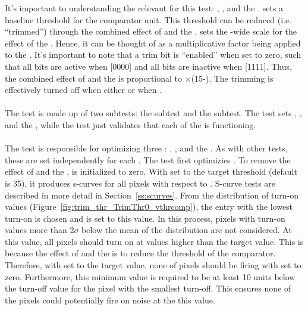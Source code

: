 It's important to understanding the relevant \dacs for this test: \vthrcomp, \vtrim, and the \trimbits.
\vthrcomp sets a baseline threshold for the comparator unit.
This threshold can be reduced (i.e. ``trimmed'') through the combined effect of \vtrim and the \trimbits.
\vtrim sets the \roc-wide scale for the effect of the \trimbits.
Hence, it can be thought of as a multiplicative factor being applied to the \trimbits.
It's important to note that a trim bit is ``enabled'' when set to zero, 
such that all bits are active when  [0000] and all bits are inactive when  [1111].
Thus, the combined effect of \vtrim and the \trimbits is proportional to \vtrim$\times$(15-\trimbits).
The trimming is effectively turned off when either  or when .
\\\\
The \trimming test is made up of two subtests: the \trim subtest and the \trimbit subtest. 
The \trim test sets \vthrcomp, \vtrim, and the \trimbits, while the \trimbit test just validates that each of the \trimbits is functioning.
\\\\
The \trim test is responsible for optimizing three \dacs: \vthrcomp, \vtrim, and the \trimbits.
As with other tests, these \dacs are set independently for each \roc.
The \trim test first optimizies \vthrcomp.
To remove the effect of \vtrim and the \trimbits, \vtrim is initialized to zero.
With \vcal set to the target threshold (default is 35), it produces s-curves for all pixels with respect to \vthrcomp.
S-curve tests are described in more detail in Section~\ref{ss:scurves}.
From the distribution of turn-on values (Figure~\ref{fig:trim_thr_TrimThr0_vthrcomp}), 
the entry with the lowest \vthrcomp turn-on is chosen and \vthrcomp is set to this value.
In this process, pixels with turn-on values more than 2$\sigma$ below the mean of the distribution are not considered.
At this \vthrcomp value, all pixels should turn on at \vcal values higher than the target value.
This is because the effect of \vtrim and the \trimbits is to reduce the threshold of the comparator.
Therefore, with \vcal set to the target value, none of pixels should be firing with \vtrim set to zero.
Furthermore, this minimum \vthrcomp value is required to be at least 10 \dac units 
below the \vthrcomp turn-off value for the pixel with the smallest \vthrcomp turn-off.
This ensures none of the pixels could potentially fire on noise at the this \vthrcomp value.
\\\\
